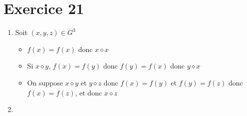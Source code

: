 \part{Exercice 21}

\begin{enumerate}
	\section{Préliminaires}
	\item Soit $(x,y,z) \in G^3$

		\begin{itemize}
			\item $f(x) = f(x)$ donc $x \diamond x$
			\item Si $x \diamond y$, $f(x) = f(y)$ donc $f(y) = f(x)$ donc $y \diamond x$
			\item On suppose $x \diamond y$ et $y \diamond z$ donc $f(x) = f(y)$ et $f(y) = f(z)$ donc $f(x) = f(z)$, et donc $x \diamond z$
		\end{itemize}
	\item 
\end{enumerate}
